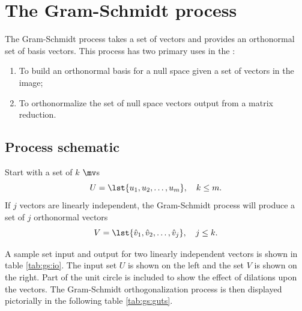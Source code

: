 \chapter{The Gram-Schmidt process}

The Gram-Schmidt process takes a set of vectors and provides an orthonormal set of basis vectors. This process has two primary uses in the \svdp:
\begin{enumerate}
\item To build an orthonormal basis for a null space given a set of vectors in the image;
\item To orthonormalize the set of null space vectors output from a matrix reduction.
\end{enumerate}

\section{Process schematic}
Start with a set of $k$ $\mv$s
\begin{equation}
  U = \lst{u_{1},u_{2},\dots,u_{m}}, \quad k\le m.
\end{equation}
If $j$ vectors are linearly independent, the Gram-Schmidt process will produce a set of $j$ orthonormal vectors
\begin{equation}
  V = \lst{\hat{v}_{1},\hat{v}_{2},\dots,\hat{v}_{j}}, \quad j\le k.
\end{equation}

A sample set input and output for two linearly independent vectors is shown in table \eqref{tab:gs:io}. The input set $U$ is shown on the left and the set $V$ is shown on the right. Part of the unit circle is included to show the effect of dilations upon the vectors. The Gram-Schmidt orthogonalization process is then displayed pictorially in the following table \eqref{tab:gs:guts}.

